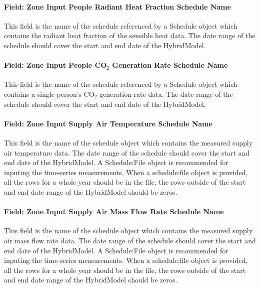 \paragraph{Field: Zone Input People Radiant Heat Fraction Schedule Name}\label{field-zone-input-people-radiant-heat-fraction-schedule-name-hm}
This field is the name of the schedule referenced by a Schedule object which contains the radiant heat fraction of the sensible heat data. The date range of the schedule should cover the start and end date of the HybridModel.

\paragraph{Field: Zone Input People CO$_2$ Generation Rate Schedule Name}\label{field-zone-input-people-co2-generation-rate-schedule-name-hm}
This field is the name of the schedule referenced by a Schedule object which contains a single person's CO$_2$ generation rate data. The date range of the schedule should cover the start and end date of the HybridModel.

\paragraph{Field: Zone Input Supply Air Temperature Schedule Name}\label{field-zone-input-supply-air-temperature-schedule-name-hm}
This field is the name of the schedule object which contains the measured supply air temperature data. The date range of the schedule should cover the start and end date of the HybridModel. A Schedule:File object is recommended for inputing the time-series measurements. When a schedule:file object is provided, all the rows for a whole year should be in the file, the rows outside of the start and end date range of the HybridModel should be zeros.

\paragraph{Field: Zone Input Supply Air Mass Flow Rate Schedule Name}\label{field-zone-input-supply-air-mass-flow-rate-schedule-name-hm}
This field is the name of the schedule object which contains the measured supply air mass flow rate data. The date range of the schedule should cover the start and end date of the HybridModel. A Schedule:File object is recommended for inputing the time-series measurements. When a schedule:file object is provided, all the rows for a whole year should be in the file, the rows outside of the start and end date range of the HybridModel should be zeros.

